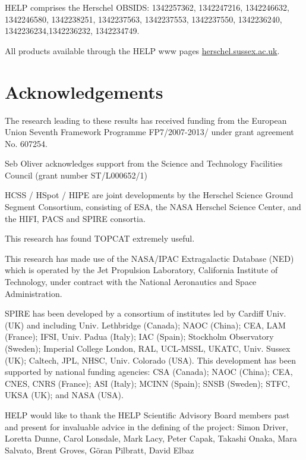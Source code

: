 \documentclass[usenatbib]{mnras}
\begin{document}
HELP comprises the  Herschel OBSIDS: 1342257362, 1342247216,
1342246632, 1342246580, 1342238251, 1342237563, 1342237553, 1342237550,
1342236240, 1342236234,1342236232, 1342234749.

All products available through the HELP www pages \url{herschel.sussex.ac.uk}.




\section*{Acknowledgements}


The research leading to these results has received funding from the European
Union Seventh Framework Programme FP7/2007-2013/ under grant agreement No.
607254.


Seb Oliver acknowledges support from the Science and Technology Facilities
Council (grant number ST/L000652/1)


HCSS / HSpot / HIPE are joint developments by the Herschel Science Ground
Segment Consortium, consisting of ESA, the NASA Herschel Science Center, and the
HIFI, PACS and SPIRE consortia.

This research has found TOPCAT \citep{2005ASPC..347...29T} extremely useful.

This research has made use of the NASA/IPAC Extragalactic Database (NED) which
is operated by the Jet Propulsion Laboratory, California Institute of
Technology, under contract with the National Aeronautics and Space
Administration.

SPIRE has been developed by a consortium of institutes led by Cardiff Univ. (UK)
and including Univ. Lethbridge (Canada); NAOC (China); CEA, LAM (France); IFSI,
Univ. Padua (Italy); IAC (Spain); Stockholm Observatory (Sweden); Imperial
College London, RAL, UCL-MSSL, UKATC, Univ. Sussex (UK); Caltech, JPL, NHSC,
Univ. Colorado (USA). This development has been supported by national funding
agencies: CSA (Canada); NAOC (China); CEA, CNES, CNRS (France); ASI (Italy);
MCINN (Spain); SNSB (Sweden); STFC, UKSA (UK); and NASA (USA).

HELP would like to thank the HELP Scientific Advisory Board members past and
present for invaluable advice in the defining of the project: Simon Driver,
Loretta Dunne, Carol Lonsdale, Mark Lacy, Peter Capak, Takashi Onaka, Mara
Salvato, Brent Groves, G\"{o}ran Pilbratt, David Elbaz
\end{document}
